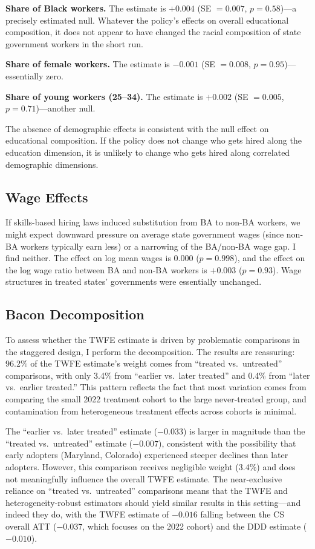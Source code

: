 \documentclass[12pt]{article}
\begin{document}
\textbf{Share of Black workers.} The estimate is $+0.004$ (SE $= 0.007$, $p = 0.58$)---a precisely estimated null. Whatever the policy's effects on overall educational composition, it does not appear to have changed the racial composition of state government workers in the short run.

\textbf{Share of female workers.} The estimate is $-0.001$ (SE $= 0.008$, $p = 0.95$)---essentially zero.

\textbf{Share of young workers (25--34).} The estimate is $+0.002$ (SE $= 0.005$, $p = 0.71$)---another null.

The absence of demographic effects is consistent with the null effect on educational composition. If the policy does not change who gets hired along the education dimension, it is unlikely to change who gets hired along correlated demographic dimensions.

\subsection{Wage Effects}

If skills-based hiring laws induced substitution from BA to non-BA workers, we might expect downward pressure on average state government wages (since non-BA workers typically earn less) or a narrowing of the BA/non-BA wage gap. I find neither. The effect on log mean wages is $0.000$ ($p = 0.998$), and the effect on the log wage ratio between BA and non-BA workers is $+0.003$ ($p = 0.93$). Wage structures in treated states' governments were essentially unchanged.

\subsection{Bacon Decomposition}

To assess whether the TWFE estimate is driven by problematic comparisons in the staggered design, I perform the \citet{GoodmanBacon2021} decomposition. The results are reassuring: 96.2\% of the TWFE estimate's weight comes from ``treated vs.\ untreated'' comparisons, with only 3.4\% from ``earlier vs.\ later treated'' and 0.4\% from ``later vs.\ earlier treated.'' This pattern reflects the fact that most variation comes from comparing the small 2022 treatment cohort to the large never-treated group, and contamination from heterogeneous treatment effects across cohorts is minimal.

The ``earlier vs.\ later treated'' estimate ($-0.033$) is larger in magnitude than the ``treated vs.\ untreated'' estimate ($-0.007$), consistent with the possibility that early adopters (Maryland, Colorado) experienced steeper declines than later adopters. However, this comparison receives negligible weight (3.4\%) and does not meaningfully influence the overall TWFE estimate. The near-exclusive reliance on ``treated vs.\ untreated'' comparisons means that the TWFE and heterogeneity-robust estimators should yield similar results in this setting---and indeed they do, with the TWFE estimate of $-0.016$ falling between the CS overall ATT ($-0.037$, which focuses on the 2022 cohort) and the DDD estimate ($-0.010$).
\end{document}
